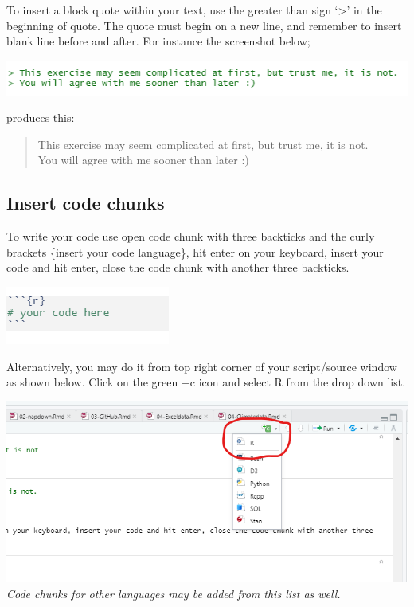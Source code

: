 \documentclass[
]{book}
\let\origfigure\figure
\let\endorigfigure\endfigure
\renewenvironment{figure}[1][2] {
    \expandafter\origfigure\expandafter[H]
} {
    \endorigfigure
}
\begin{document}
To insert a block quote within your text, use the greater than sign `\textgreater{}' in the beginning of quote. The quote must begin on a new line, and remember to insert blank line before and after. For instance the screenshot below;

\begin{figure}
\centering
\includegraphics{tutorial_screenshots/block_quote.png}
\caption{block quote}
\end{figure}

produces this:

\begin{quote}
This exercise may seem complicated at first, but trust me, it is not.\\
You will agree with me sooner than later :)
\end{quote}

\hypertarget{insert-code-chunks}{%
\subsection{Insert code chunks}\label{insert-code-chunks}}

To write your code use open code chunk with three backticks
and the curly brackets \{insert your code language\}, hit enter on your keyboard, insert your code and hit enter, close the code chunk with another three backticks.

\begin{figure}
\centering
\includegraphics{tutorial_screenshots/code_chunk.png}
\caption{insert code chunk}
\end{figure}

Alternatively, you may do it from top right corner of your script/source window as shown below.
Click on the green +c icon and select R from the drop down list.

\includegraphics{tutorial_screenshots/code_chunk2.png}
\emph{Code chunks for other languages may be added from this list as well.}
\end{document}
